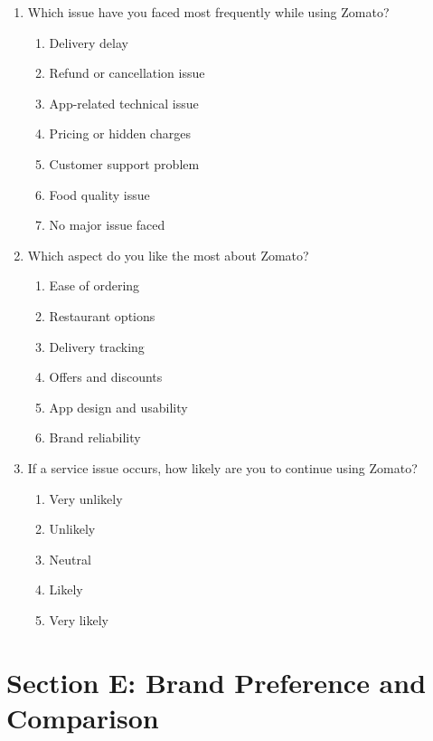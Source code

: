 \begin{enumerate}[resume,label=\textbf{Q\arabic*.}]
    \item Which issue have you faced most frequently while using Zomato?
    \begin{enumerate}[label=\alph*.]
        \item Delivery delay
        \item Refund or cancellation issue
        \item App-related technical issue
        \item Pricing or hidden charges
        \item Customer support problem
        \item Food quality issue
        \item No major issue faced
    \end{enumerate}

    \item Which aspect do you like the most about Zomato?
    \begin{enumerate}[label=\alph*.]
        \item Ease of ordering
        \item Restaurant options
        \item Delivery tracking
        \item Offers and discounts
        \item App design and usability
        \item Brand reliability
    \end{enumerate}

    \item If a service issue occurs, how likely are you to continue using Zomato?
    \begin{enumerate}[label=\alph*.]
        \item Very unlikely
        \item Unlikely
        \item Neutral
        \item Likely
        \item Very likely
    \end{enumerate}
\end{enumerate}

\section*{Section E: Brand Preference and Comparison}

